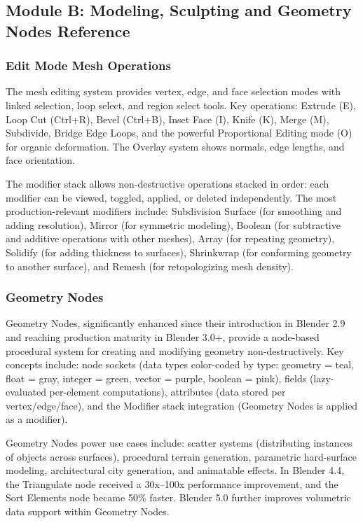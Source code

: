 \documentclass[11pt,letterpaper]{article}
\begin{document}
\subsection{Module B: Modeling, Sculpting and Geometry Nodes Reference}

\subsubsection{Edit Mode Mesh Operations}

The mesh editing system provides vertex, edge, and face selection modes with linked selection, loop select, and region select tools. Key operations: Extrude (E), Loop Cut (Ctrl+R), Bevel (Ctrl+B), Inset Face (I), Knife (K), Merge (M), Subdivide, Bridge Edge Loops, and the powerful Proportional Editing mode (O) for organic deformation. The Overlay system shows normals, edge lengths, and face orientation.

The modifier stack allows non-destructive operations stacked in order: each modifier can be viewed, toggled, applied, or deleted independently. The most production-relevant modifiers include: Subdivision Surface (for smoothing and adding resolution), Mirror (for symmetric modeling), Boolean (for subtractive and additive operations with other meshes), Array (for repeating geometry), Solidify (for adding thickness to surfaces), Shrinkwrap (for conforming geometry to another surface), and Remesh (for retopologizing mesh density).

\subsubsection{Geometry Nodes}

Geometry Nodes, significantly enhanced since their introduction in Blender 2.9 and reaching production maturity in Blender 3.0+, provide a node-based procedural system for creating and modifying geometry non-destructively. Key concepts include: node sockets (data types color-coded by type: geometry = teal, float = gray, integer = green, vector = purple, boolean = pink), fields (lazy-evaluated per-element computations), attributes (data stored per vertex/edge/face), and the Modifier stack integration (Geometry Nodes is applied as a modifier).

Geometry Nodes power use cases include: scatter systems (distributing instances of objects across surfaces), procedural terrain generation, parametric hard-surface modeling, architectural city generation, and animatable effects. In Blender 4.4, the Triangulate node received a 30x--100x performance improvement, and the Sort Elements node became 50\% faster. Blender 5.0 further improves volumetric data support within Geometry Nodes.
\end{document}
